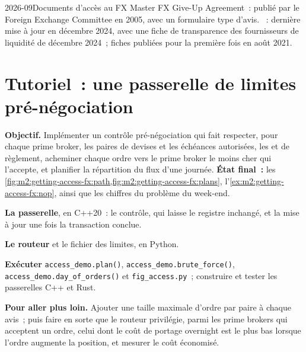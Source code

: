 \begin{dated}{2026-09}{Documents d'accès au FX}\label{dat:m2:getting-access-fx:disclosure}
Master FX Give-Up Agreement~: publié par le Foreign Exchange Committee en 2005, avec un
formulaire type d'avis. ~: dernière mise à jour en décembre 2024, avec une fiche de transparence des fournisseurs de liquidité de décembre
2024~; fiches publiées pour la première fois en août
2021.
\end{dated}

\section{Tutoriel~: une passerelle de limites pré-négociation}\label{tut:m2:getting-access-fx:gate}

\begin{tutorial}
\textbf{Objectif.} Implémenter un contrôle pré-négociation qui fait respecter, pour chaque prime broker, les
paires de devises et les échéances autorisées, les  et de règlement, acheminer chaque ordre vers
le prime broker le moins cher qui l'accepte, et planifier la répartition du flux d'une journée.
\textbf{État final~:} les \cref{fig:m2:getting-access-fx:path,fig:m2:getting-access-fx:plans},
l'\cref{ex:m2:getting-access-fx:nop}, ainsi que les chiffres du problème du week-end.
\begin{tutsteps}
\item \textbf{La passerelle}, en C++20~: le contrôle, qui laisse le registre inchangé, et la
mise à jour une fois la transaction conclue.
\label{lst:m2:getting-access-fx:gate}
\item \textbf{Le routeur} et le fichier des limites, en Python.
\label{lst:m2:getting-access-fx:route}
\item \textbf{Exécuter} \texttt{access\_demo.plan()}, \texttt{access\_demo.brute\_force()},
\texttt{access\_demo.day\_of\_orders()} et \texttt{fig\_access.py}~; construire et tester les
passerelles C++ et Rust.
\end{tutsteps}
\textbf{Pour aller plus loin.} Ajouter une taille maximale d'ordre par paire à chaque avis~; puis
faire en sorte que le routeur privilégie, parmi les prime brokers qui acceptent un ordre, celui dont
le coût de portage overnight est le plus bas lorsque l'ordre augmente la position, et mesurer le coût
économisé.
\end{tutorial}

